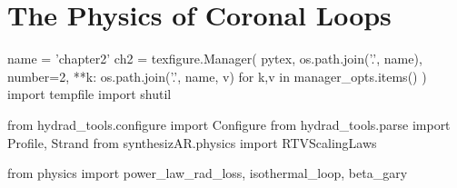 \chapter{The Physics of Coronal Loops}\label{ch:loops}

\begin{pycode}[chapter2]
name = 'chapter2'
ch2 = texfigure.Manager(
    pytex,
    os.path.join('.', name),
    number=2,
    **{k: os.path.join('.', name, v) for k,v in manager_opts.items()}
)
import tempfile
import shutil

from hydrad_tools.configure import Configure
from hydrad_tools.parse import Profile, Strand
from synthesizAR.physics import RTVScalingLaws

from physics import power_law_rad_loss, isothermal_loop, beta_gary
\end{pycode}


